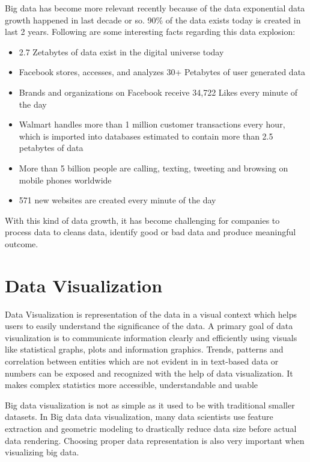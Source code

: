 \documentclass[sigconf]{acmart}
\begin{document}
Big data has become more relevant recently because of the data exponential data growth happened in last decade or so. 90\% of the data exists today is created in last 2 years\cite{sept1001}. Following are some interesting facts regarding this data explosion:
\begin{itemize}
    \item 2.7 Zetabytes of data exist in the digital universe today
    \item Facebook stores, accesses, and analyzes 30+ Petabytes of user generated data
    \item Brands and organizations on Facebook receive 34,722 Likes every minute of the day
    \item Walmart handles more than 1 million customer transactions every hour, which is imported into databases estimated to contain more than 2.5 petabytes of data
    \item More than 5 billion people are calling, texting, tweeting and browsing on mobile phones worldwide
    \item 571 new websites are created every minute of the day
\end{itemize}\cite{sept1002}

With this kind of data growth, it has become challenging for companies to process data to cleans data, identify good or bad data and produce meaningful outcome.

\section{Data Visualization}

Data Visualization is representation of the data in a visual context which helps users to easily understand the significance of the data. A primary goal of data visualization is to communicate information clearly and efficiently using visuals like statistical graphs, plots and information graphics\cite{sept1003}. Trends, patterns and correlation between entities which are not evident in in text-based data or numbers can be exposed and recognized with the help of data visualization. It makes complex statistics more accessible, understandable and usable\cite{sept1003}

Big data visualization is not as simple as it used to be with traditional smaller datasets.  In Big data data visualization, many data scientists use feature extraction and geometric modeling to drastically reduce data size before actual data rendering. Choosing proper data representation is also very important when visualizing big data.\cite{sept1004} 
\end{document}
